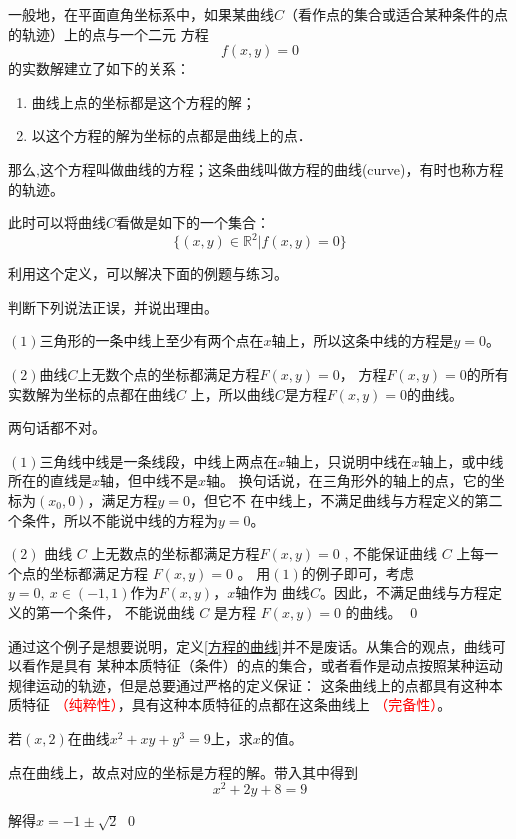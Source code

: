 \begin{definition}\label{方程的曲线}
    一般地，在平面直角坐标系中，如果某曲线$C$（看作点的集合或适合某种条件的点的轨迹）上的点与一个二元
方程\[f(x,y)=0\]的实数解建立了如下的关系：
\vspace*{-8pt}
\begin{enumerate}
    \setlength{\itemsep}{-\itemsep}
    \item 曲线上点的坐标都是这个方程的解；
    \item 以这个方程的解为坐标的点都是曲线上的点．
\end{enumerate}
\vspace*{-8pt}
那么,这个方程叫做曲线的方程；这条曲线叫做方程的曲线(curve)，有时也称方程的轨迹。

此时可以将曲线$C$看做是如下的一个集合：
\vspace*{-10pt}
\[\{(x,y)\in\mathbb{R}^2|f(x,y)=0\}\]
\end{definition}
利用这个定义，可以解决下面的例题与练习。
\begin{example}判断下列说法正误，并说出理由。

    $(1)$三角形的一条中线上至少有两个点在$x$轴上，所以这条中线的方程是$y=0$。

    \((2)\)曲线\(C\)上无数个点的坐标都满足方程$F(x,y)=0$，
    方程$F(x,y)=0$的所有实数解为坐标的点都在曲线$C$
    上，所以曲线\(C\)是方程$F(x,y)=0$的曲线。
\end{example}
\begin{jie}
    两句话都不对。

    \((1)\)三角线中线是一条线段，中线上两点在\(x\)轴上，只说明中线在\(x\)轴上，或中线所在的直线是\(x\)轴，但中线不是\(x\)轴。
    换句话说，在三角形外的轴上的点，它的坐标为\((x_0,0)\)，满足方程$y=0$，但它不
    在中线上，不满足曲线与方程定义的第二个条件，所以不能说中线的方程为\(y=0\)。

    \((2)\) 曲线 $ C $ 上无数点的坐标都满足方程$  F(x, y)   =0$ , 
    不能保证曲线  $C $ 上每一个点的坐标都满足方程  $F(x ,  y)=0$ 。
    用\((1)\)的例子即可，考虑\(y=0,\ x\in(-1,1)\)作为\(F(x,y)\)，\(x\)轴作为
    曲线\(C\)。因此，不满足曲线与方程定义的第一个条件， 不能说曲线  $C$  是方程 $ F(x, y)=0$  的曲线。
\qed
\end{jie}

通过这个例子是想要说明，定义\ref{方程的曲线}并不是废话。从集合的观点，曲线可以看作是具有
某种本质特征（条件）的点的集合，或者看作是动点按照某种运动规律运动的轨迹，但是总要通过严格的定义保证：
这条曲线上的点都具有这种本质特征 \textcolor{red}{（纯粹性）}，具有这种本质特征的点都在这条曲线上 \textcolor{red}{（完备性）}。
\begin{example}
若\((x,2)\)在曲线\(x^2+xy+y^3=9\)上，求\(x\)的值。
\end{example}
\begin{jie}
    点在曲线上，故点对应的坐标是方程的解。带入其中得到
    \[x^2+2y+8=9\]

    解得\(x=-1\pm\sqrt{2}\)
    \qed
\end{jie}

